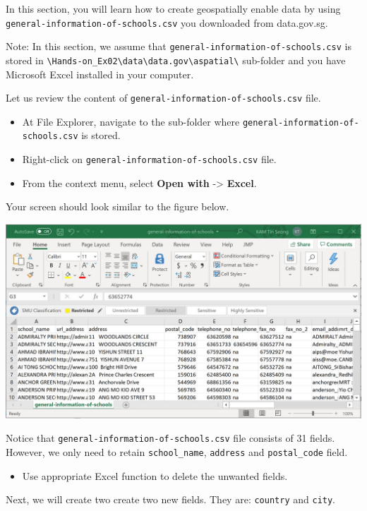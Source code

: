 \documentclass[
  letterpaper,
  DIV=11,
  numbers=noendperiod]{scrreprt}
\providecommand{\tightlist}{%
  \setlength{\itemsep}{0pt}\setlength{\parskip}{0pt}}\usepackage{longtable,booktabs,array}
\begin{document}
In this section, you will learn how to create geospatially enable data
by using \texttt{general-information-of-schools.csv} you downloaded from
data.gov.sg.

Note: In this section, we assume that
\texttt{general-information-of-schools.csv} is stored in
\texttt{\textbackslash{}Hands-on\_Ex02\textbackslash{}data\textbackslash{}data.gov\textbackslash{}aspatial\textbackslash{}}
sub-folder and you have Microsoft Excel installed in your computer.

Let us review the content of \texttt{general-information-of-schools.csv}
file.

\begin{itemize}
\tightlist
\item
  At File Explorer, navigate to the sub-folder where
  \texttt{general-information-of-schools.csv} is stored.
\item
  Right-click on \texttt{general-information-of-schools.csv} file.
\item
  From the context menu, select \textbf{Open with} -\textgreater{}
  \textbf{Excel}.
\end{itemize}

Your screen should look similar to the figure below.

\includegraphics{./img02/image16.jpg}

Notice that \texttt{general-information-of-schools.csv} file consists of
31 fields. However, we only need to retain \texttt{school\_name},
\texttt{address} and \texttt{postal\_code} field.

\begin{itemize}
\tightlist
\item
  Use appropriate Excel function to delete the unwanted fields.
\end{itemize}

Next, we will create two create two new fields. They are:
\texttt{country} and \texttt{city}.
\end{document}
